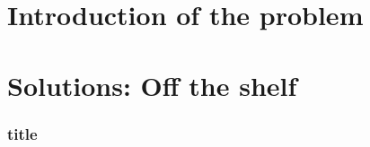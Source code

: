 \section{Introduction of the problem}
    

    

\section{Solutions: Off the shelf}
    \begin{frame}
        \frametitle{title}
    \end{frame}


